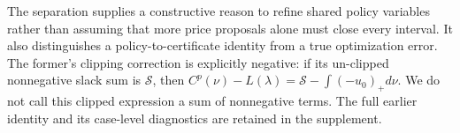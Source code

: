 The separation supplies a constructive reason to refine shared policy variables rather than assuming that more price proposals alone must close every interval. It also distinguishes a policy-to-certificate identity from a true optimization error. The former's clipping correction is explicitly negative: if its un-clipped nonnegative slack sum is $\mathcal S$, then $C^p(\nu)-L(\lambda)=\mathcal S-\int(-u_0)_+d\nu$. We do not call this clipped expression a sum of nonnegative terms. The full earlier identity and its case-level diagnostics are retained in the supplement.
